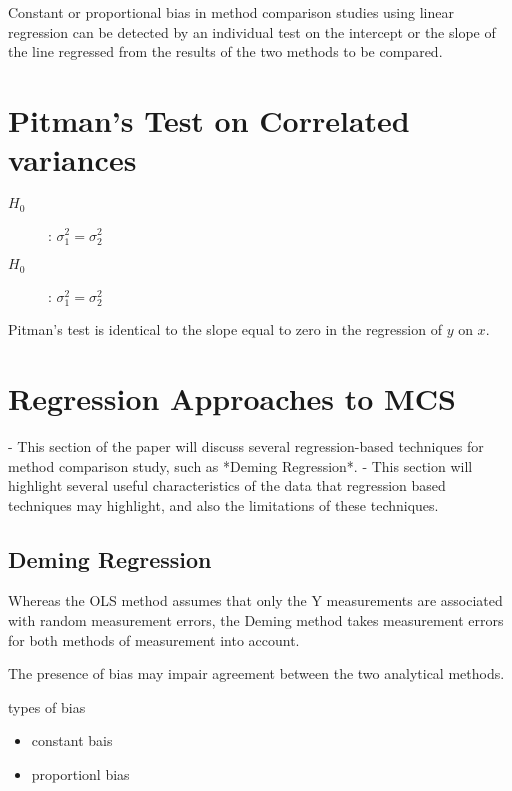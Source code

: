 \documentclass[12pt, a4paper]{report}
\theoremstyle{plain}
\theoremstyle{definition}
\theoremstyle{remark}
\begin{document}
Constant or proportional bias in method comparison studies using linear regression can be detected by an individual test on the intercept or the slope of the line regressed from the results of the two methods to be compared.






\section*{Pitman's Test on Correlated variances}
\begin{description}
	\item[$H_0$] : $\sigma^2_1 = \sigma^2_2$
	\item[$H_0$] : $\sigma^2_1 = \sigma^2_2$
\end{description}


Pitman's test is identical to the slope equal to zero in the regression of $y$ on $x$.




\section{Regression Approaches to MCS}
- This section of the paper will discuss several regression-based techniques for method comparison study, 
such as *Deming Regression*. 
- This section will highlight several useful characteristics of the data that 
regression based techniques may highlight, and also the limitations of these techniques.

\subsection*{ Deming Regression}
Whereas the OLS method assumes that only the Y measurements are associated with 
random measurement errors, the Deming method takes measurement errors for both methods of measurement into account.




The presence of bias may impair agreement between the two analytical methods.

types of bias

\begin{itemize}
	\item constant bais
	\item proportionl bias
\end{itemize}
\end{document}
